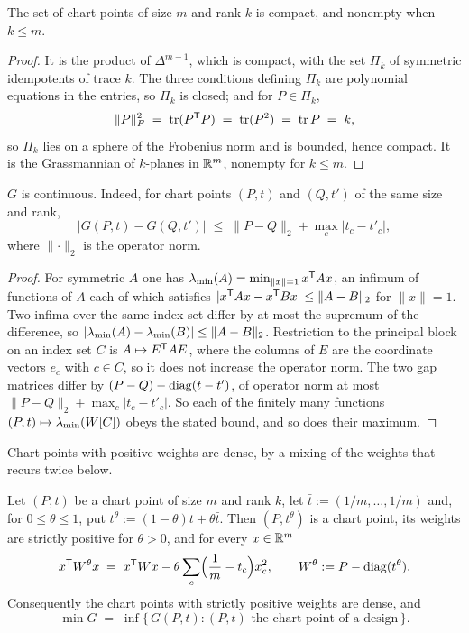 \begin{lemma}\label{lem:compact}
The set of chart points of size $m$ and rank $k$ is compact, and
nonempty when $k\le m$.
\end{lemma}

\begin{proof}
It is the product of $\Delta^{m-1}$, which is compact, with the set
$\Pi_k$ of symmetric idempotents of trace $k$.  The three conditions
defining $\Pi_k$ are polynomial equations in the entries, so $\Pi_k$ is
closed; and for $P\in\Pi_k$,
\[
  \lVert P\rVert_{F}^{2}\;=\;\operatorname{tr}(P^{\mathsf{T}} P)\;=\;\operatorname{tr}(P^{2})\;=\;\operatorname{tr} P\;=\;k ,
\]
so $\Pi_k$ lies on a sphere of the Frobenius norm and is bounded, hence
compact.  It is the Grassmannian of $k$-planes in $\mathbb{R}^m$, nonempty for
$k\le m$.
\end{proof}

\begin{lemma}\label{lem:continuity}
$G$ is continuous.  Indeed, for chart points $(P,t)$ and $(Q,t')$ of the
same size and rank,
\[
  \bigl\lvert G(P,t)-G(Q,t')\bigr\rvert
  \;\le\;\lVert P-Q\rVert_{2}+\max_c\lvert t_c-t'_c\rvert ,
\]
where $\lVert\cdot\rVert_{2}$ is the operator norm.
\end{lemma}

\begin{proof}
For symmetric $A$ one has
$\lambda_{\min}(A)=\min_{\lVert x\rVert=1}x^{\mathsf{T}} Ax$, an infimum of functions of $A$
each of which satisfies
$\lvert x^{\mathsf{T}} Ax-x^{\mathsf{T}} Bx\rvert\le\lVert A-B\rVert_{2}$ for
$\lVert x\rVert=1$.  Two infima over the same index set differ by at
most the supremum of the difference, so
$\lvert\lambda_{\min}(A)-\lambda_{\min}(B)\rvert\le\lVert A-B\rVert_{2}$.  Restriction to
the principal block on an index set $C$ is $A\mapsto E^{\mathsf{T}} AE$, where the
columns of $E$ are the coordinate vectors $e_c$ with $c\in C$, so it
does not increase the operator norm.  The two gap matrices differ by
$(P-Q)-\operatorname{diag}(t-t')$, of operator norm at most
$\lVert P-Q\rVert_{2}+\max_c\lvert t_c-t'_c\rvert$.  So each of the
finitely many functions $(P,t)\mapsto\lambda_{\min}(W[C])$ obeys the stated bound,
and so does their maximum.
\end{proof}

Chart points with positive weights are dense, by a mixing of the weights
that recurs twice below.

\begin{lemma}\label{lem:relax}
Let $(P,t)$ be a chart point of size $m$ and rank $k$, let
$\bar t:=(1/m,\dots,1/m)$ and, for $0\le\theta\le1$, put
$t^{\theta}:=(1-\theta)t+\theta\bar t$.  Then $(P,t^{\theta})$ is a chart
point, its weights are strictly positive for $\theta>0$, and for every
$x\in\mathbb{R}^m$
\begin{equation}\label{eq:relax}
  x^{\mathsf{T}} W^{\theta}x\;=\;x^{\mathsf{T}} Wx-\theta\sum_c
    \Bigl(\frac1m-t_c\Bigr)x_c^{2},
  \qquad W^{\theta}:=P-\operatorname{diag}(t^{\theta}) .
\end{equation}
Consequently the chart points with strictly positive weights are dense,
and
\[
  \min G\;=\;\inf\{\,G(P,t):\text{$(P,t)$ the chart point of a design}\,\}.
\]
\end{lemma}


